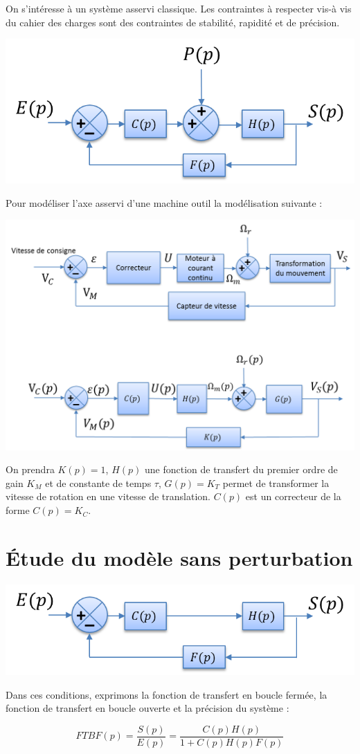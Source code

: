\documentclass[10pt,fleqn]{article} %
\begin{document}
On s'intéresse à un système asservi classique. Les contraintes à respecter vis-à vis du cahier des charges sont des contraintes de stabilité, rapidité et de précision.

\begin{center}
\includegraphics[width=.55\textwidth]{images/bloc1}
\end{center}

\begin{exemple}
Pour modéliser l'axe asservi d'une machine outil la modélisation suivante :
\begin{center}
\includegraphics[width=.6\textwidth]{images/bloc2}
\end{center}
On prendra $K(p)=1$, $H(p)$ une fonction de transfert du premier ordre de gain $K_M$ et de constante de temps $\tau$, $G(p)=K_T$ permet de transformer la vitesse de rotation en une vitesse de translation. $C(p)$ est un correcteur de la forme $C(p)=K_C$.
\end{exemple}


\section{Étude du modèle sans perturbation}


\begin{minipage}[c]{.48\linewidth}
\begin{center}
\includegraphics[width=.95\textwidth]{images/bloc11}
\end{center}
\end{minipage}\hfill
\begin{minipage}[c]{.48\linewidth}
Dans ces conditions, exprimons la fonction de transfert en boucle fermée, la fonction de transfert en boucle ouverte et la précision du système :

$$
FTBF(p)
=\dfrac{S(p)}{E(p)}
=\dfrac{C(p)H(p)}{1+C(p)H(p)F(p)}
$$

\end{minipage}
\end{document}
